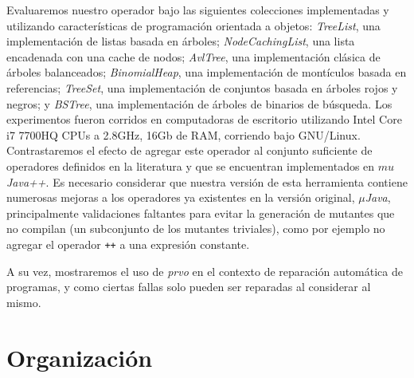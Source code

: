 Evaluaremos nuestro operador bajo las siguientes colecciones implementadas y utilizando caracter\'isticas de programaci\'on orientada a objetos: \emph{TreeList}, una implementaci\'on de listas basada en \'arboles; \emph{NodeCachingList}, una lista encadenada con una cache de nodos; \emph{AvlTree}, una implementaci\'on cl\'asica de \'arboles balanceados; \emph{BinomialHeap}, una implementaci\'on de mont\'iculos basada en referencias; \emph{TreeSet}, una implementaci\'on de conjuntos basada en \'arboles rojos y negros; y \emph{BSTree}, una implementaci\'on de \'arboles de binarios de b\'usqueda. Los experimentos fueron corridos en computadoras de escritorio utilizando Intel Core i7 7700HQ CPUs a 2.8GHz, 16Gb de RAM, corriendo bajo GNU/Linux. Contrastaremos el efecto de agregar este operador al conjunto suficiente de operadores definidos en la literatura y que se encuentran implementados en \emph{$mu$Java++}. Es necesario considerar que nuestra versi\'on de esta herramienta contiene numerosas mejoras a los operadores ya existentes en la versi\'on original, \emph{$\mu$Java}, principalmente validaciones faltantes para evitar la generaci\'on de mutantes que no compilan (un subconjunto de los mutantes triviales), como por ejemplo no agregar el operador \texttt{++} a una expresi\'on constante.

A su vez, mostraremos el uso de \emph{prvo} en el contexto de reparaci\'on autom\'atica de programas, y como ciertas fallas solo pueden ser reparadas al considerar al mismo.

\section{Organizaci\'on}
\label{sec:intro.organizacion}

